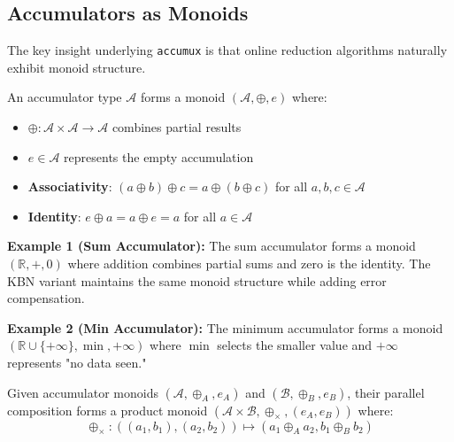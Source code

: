 \documentclass[sigconf]{acmart}
\newcommand{\accumux}{\texttt{accumux}\xspace}
\begin{document}
\subsection{Accumulators as Monoids}

The key insight underlying \accumux is that online reduction algorithms naturally exhibit monoid structure.

\begin{definition}
An accumulator type $\mathcal{A}$ forms a monoid $(\mathcal{A}, \oplus, e)$ where:
\begin{itemize}
\item $\oplus : \mathcal{A} \times \mathcal{A} \rightarrow \mathcal{A}$ combines partial results
\item $e \in \mathcal{A}$ represents the empty accumulation
\item \textbf{Associativity}: $(a \oplus b) \oplus c = a \oplus (b \oplus c)$ for all $a, b, c \in \mathcal{A}$
\item \textbf{Identity}: $e \oplus a = a \oplus e = a$ for all $a \in \mathcal{A}$
\end{itemize}
\end{definition}

\textbf{Example 1 (Sum Accumulator):}
The sum accumulator forms a monoid $(\mathbb{R}, +, 0)$ where addition combines partial sums and zero is the identity. The KBN variant maintains the same monoid structure while adding error compensation.

\textbf{Example 2 (Min Accumulator):}
The minimum accumulator forms a monoid $(\mathbb{R} \cup \{+\infty\}, \min, +\infty)$ where $\min$ selects the smaller value and $+\infty$ represents "no data seen."

\begin{theorem}
Given accumulator monoids $(\mathcal{A}, \oplus_A, e_A)$ and $(\mathcal{B}, \oplus_B, e_B)$, their parallel composition forms a product monoid $(\mathcal{A} \times \mathcal{B}, \oplus_{\times}, (e_A, e_B))$ where:
$$\oplus_{\times}: ((a_1, b_1), (a_2, b_2)) \mapsto (a_1 \oplus_A a_2, b_1 \oplus_B b_2)$$
\end{theorem}
\end{document}
